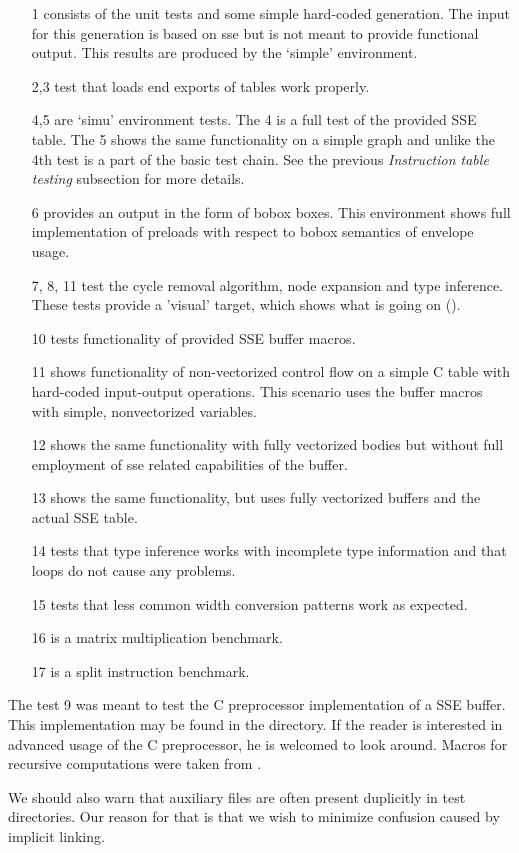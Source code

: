 \begin{enumerate}
  \item[1] consists of the unit tests and some simple hard-coded generation. The input for this generation is based on sse but is not meant to provide functional output. This results are produced by the `simple' environment.
  \item[2,3] test that loads end exports of tables work properly.
  \item[4,5] are `simu' environment tests. The 4 is a full test of the provided SSE table. The 5 shows the same functionality on a simple graph and unlike the 4th test is a part of the basic test chain. See the previous \emph{Instruction table testing} subsection for more details.
  \item[6] provides an output in the form of bobox boxes. This environment shows full implementation of preloads with respect to bobox semantics of envelope usage.
  \item[7, 8, 11] test the cycle removal algorithm, node expansion and type inference. These tests provide a 'visual' target, which shows what is going on ().
  \item[10] tests functionality of provided SSE buffer macros.
  \item[11] shows functionality of non-vectorized control flow on a simple C table with hard-coded input-output operations. This scenario uses the buffer macros with simple, nonvectorized variables.
  \item[12] shows the same functionality with fully vectorized bodies but without full employment of sse related capabilities of the buffer.
  \item[13] shows the same functionality, but uses fully vectorized buffers and the actual SSE table.
  \item[14] tests that type inference works with incomplete type information and that loops do not cause any problems.
  \item[15] tests that less common width conversion patterns work as expected.
  \item[16] is a matrix multiplication benchmark.
  \item[17] is a split instruction benchmark.
\end{enumerate}

The test 9 was meant to test the C preprocessor implementation of a SSE buffer. This implementation may be found in the  directory. If the reader is interested in advanced usage of the C preprocessor, he is welcomed to look around. Macros for recursive computations were taken from \cite{cloak}.

We should also warn that auxiliary files are often present duplicitly in test directories. Our reason for that is that we wish to minimize confusion caused by implicit linking.

